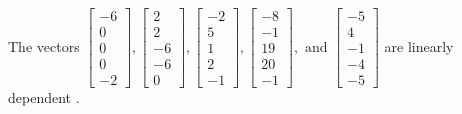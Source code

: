 \begin{exercise}
\begin{exerciseStatement}
  \end{exerciseStatement}
  \begin{exerciseAnswer}
   The vectors \(\left[\begin{array}{r}
-6 \\
0 \\
0 \\
0 \\
-2
\end{array}\right] , \left[\begin{array}{r}
2 \\
2 \\
-6 \\
-6 \\
0
\end{array}\right] , \left[\begin{array}{r}
-2 \\
5 \\
1 \\
2 \\
-1
\end{array}\right] , \left[\begin{array}{r}
-8 \\
-1 \\
19 \\
20 \\
-1
\end{array}\right] , \text{ and } \left[\begin{array}{r}
-5 \\
4 \\
-1 \\
-4 \\
-5
\end{array}\right]\) are 
  	 linearly dependent  .
  


  \end{exerciseAnswer}
\end{exercise}